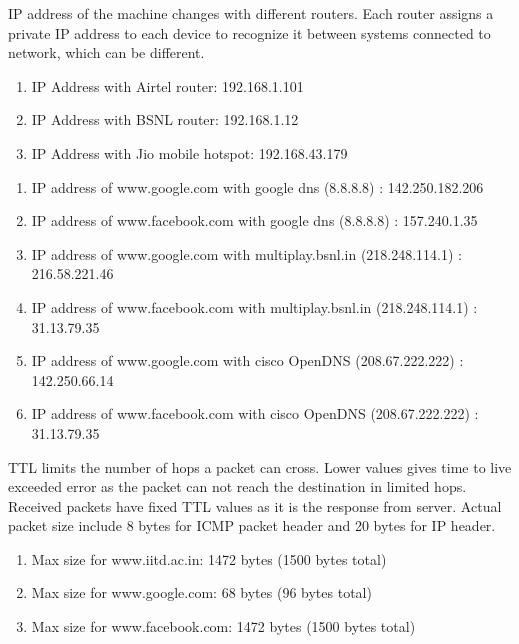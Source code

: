 \documentclass[]{assignment}
\begin{document}
\maketitle
{}
    \begin{alphaparts}
        \questionpart IP address of the machine changes with different routers. Each router assigns a private IP address to each device to recognize it between systems connected to network, which can be different. 
            \begin{enumerate}
                \item IP Address with Airtel router: 192.168.1.101
                \item IP Address with BSNL router: 192.168.1.12 
                \item IP Address with Jio mobile hotspot: 192.168.43.179
            \end{enumerate}
        \questionpart 
            \begin{enumerate}
                \item IP address of www.google.com with google dns (8.8.8.8) : 142.250.182.206
                \item IP address of www.facebook.com with google dns (8.8.8.8) : 157.240.1.35  
                \item IP address of www.google.com with multiplay.bsnl.in (218.248.114.1) : 216.58.221.46 
                \item IP address of www.facebook.com with multiplay.bsnl.in (218.248.114.1) : 31.13.79.35 
                \item IP address of www.google.com with cisco OpenDNS (208.67.222.222) : 142.250.66.14 
                \item IP address of www.facebook.com with cisco OpenDNS (208.67.222.222) : 31.13.79.35 
            \end{enumerate}

        \questionpart TTL limits the number of hops a packet can cross. Lower values gives time to live exceeded error as the packet can not reach the destination in limited hops. Received packets have fixed TTL values as it is the response from server. Actual packet size include 8 bytes for ICMP packet header and 20 bytes for IP header. 
            \begin{enumerate} 
                \item Max size for www.iitd.ac.in: 1472 bytes (1500 bytes total)
                \item Max size for www.google.com: 68 bytes (96 bytes total)
                \item Max size for www.facebook.com: 1472 bytes (1500 bytes total)
            \end{enumerate}
            

\end{alphaparts}
\end{document}
